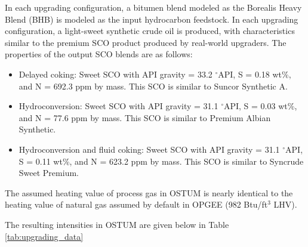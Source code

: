 \documentclass[11pt]{report}
\begin{document}
In each upgrading configuration, a bitumen blend modeled as the Borealis Heavy Blend (BHB) is modeled as the input hydrocarbon feedstock.  In each upgrading configuration, a light-sweet synthetic crude oil is produced, with characteristics similar to the premium SCO product produced by real-world upgraders.  The properties of the output SCO blends are as follows:
\begin{itemize}
\item Delayed coking: Sweet SCO with API gravity = 33.2 $^\circ$API, S = 0.18 wt\%, and N = 692.3 ppm by mass. This SCO is similar to Suncor Synthetic A.
\item Hydroconversion: Sweet SCO with API gravity = 31.1 $^\circ$API, S = 0.03 wt\%, and N = 77.6 ppm by mass. This SCO is similar to Premium Albian Synthetic.
\item Hydroconversion and fluid coking: Sweet SCO with API gravity = 31.1 $^\circ$API, S = 0.11 wt\%, and N = 623.2 ppm by mass. This SCO is similar to Syncrude Sweet Premium.
\end{itemize}

The assumed heating value of process gas in OSTUM is nearly identical to the heating value of natural gas assumed by default in OPGEE (982 Btu/ft$^3$ LHV).  

The resulting intensities in OSTUM are given below in Table \ref{tab:upgrading_data}
\end{document}

